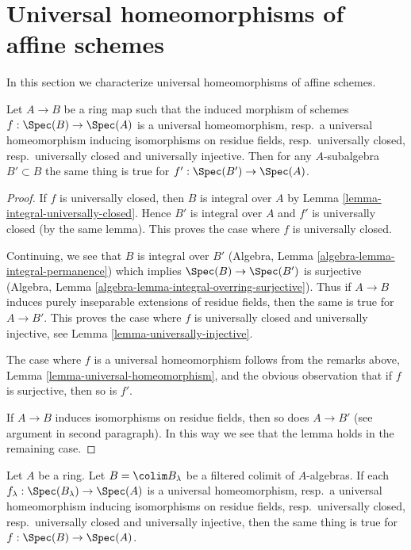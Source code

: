 \section{Universal homeomorphisms of affine schemes}
\label{section-universal-homeomorphisms-affine}

\noindent
In this section we characterize universal homeomorphisms of affine schemes.

\begin{lemma}
\label{lemma-subalgebra-inherits}
Let $A \to B$ be a ring map such that the induced morphism of
schemes $f : \Spec(B) \to \Spec(A)$ is a universal homeomorphism,
resp.\ a universal homeomorphism inducing isomorphisms on residue fields,
resp.\ universally closed,
resp.\ universally closed and universally injective.
Then for any $A$-subalgebra $B' \subset B$
the same thing is true for $f' : \Spec(B') \to \Spec(A)$.
\end{lemma}

\begin{proof}
If $f$ is universally closed, then
$B$ is integral over $A$ by Lemma \ref{lemma-integral-universally-closed}.
Hence $B'$ is integral over $A$ and $f'$
is universally closed (by the same lemma).
This proves the case where $f$ is universally closed.

\medskip\noindent
Continuing, we see that $B$ is integral over $B'$ 
(Algebra, Lemma \ref{algebra-lemma-integral-permanence})
which implies $\Spec(B) \to \Spec(B')$ is surjective
(Algebra, Lemma \ref{algebra-lemma-integral-overring-surjective}).
Thus if $A \to B$ induces purely inseparable extensions of residue fields,
then the same is true for $A \to B'$. This proves the case
where $f$ is universally closed and universally injective, see
Lemma \ref{lemma-universally-injective}.

\medskip\noindent
The case where $f$ is a universal homeomorphism follows from
the remarks above, Lemma \ref{lemma-universal-homeomorphism},
and the obvious observation that if $f$ is surjective, then so is $f'$.

\medskip\noindent
If $A \to B$ induces isomorphisms on residue fields, then
so does $A \to B'$ (see argument in second paragraph).
In this way we see that the lemma holds in the remaining case.
\end{proof}

\begin{lemma}
\label{lemma-colimit-inherits}
Let $A$ be a ring. Let $B = \colim B_\lambda$ be a filtered colimit
of $A$-algebras. If each $f_\lambda : \Spec(B_\lambda) \to \Spec(A)$
is a universal homeomorphism,
resp.\ a universal homeomorphism inducing isomorphisms on residue fields,
resp.\ universally closed,
resp.\ universally closed and universally injective,
then the same thing is true for $f : \Spec(B) \to \Spec(A)$.
\end{lemma}

